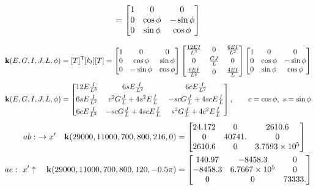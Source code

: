 \begin{enumerate}[leftmargin=*]
    \newpage{}
    \begin{minipage}{0.5\linewidth}
      \begin{equation*}
        [T] = \bmat{1 & 0 & 0\\ 0 & \cos\phi & -\sin\phi\\ 0 & \sin\phi & \cos\phi}
      \end{equation*}
    \end{minipage}\hfill
    \begin{minipage}{0.4\linewidth}\centering
      
    \end{minipage}
    \begin{equation*}
      \mathbf{k}(E,G,I,J,L,\phi) = [T]^{\mathsf{T}}[k_l][T] =
      \begin{bmatrix}1 & 0 & 0\\ 0 & \cos\phi & \sin\phi\\ 0 & -\sin\phi & \cos\phi\end{bmatrix}
      \begin{bmatrix}\frac{12EI}{L^3} & 0 & \frac{6EI}{L^2}\\[3pt] 0 & \frac{GJ}{L} & 0\\[3pt] \frac{6EI}{L^2} & 0 & \frac{4EI}{L}\end{bmatrix}
      \begin{bmatrix}1 & 0 & 0\\ 0 & \cos\phi & -\sin\phi\\ 0 & \sin\phi & \cos\phi\end{bmatrix}
    \end{equation*}
    \begin{equation*}
      \mathbf{k}(E,G,I,J,L,\phi) =
      \begin{bmatrix}
        12E\frac{I}{L^3} & 6sE\frac{I}{L^2} & 6cE\frac{I}{L^2}\\[4pt]
        6sE\frac{I}{L^2} & c^2G\frac JL + 4s^2E\frac IL & -scG\frac JL + 4scE\frac IL\\[4pt]
        6cE\frac{I}{L^2} & -scG\frac JL + 4scE\frac IL & s^2G\frac JL + 4c^2E\frac IL
      \end{bmatrix},\qquad c = \cos\phi,\ s = \sin\phi
    \end{equation*}
    \begin{align*}
      ab:\ \rightarrow x'\quad \kmat(29000, 11000, 700, 800, 216, 0) &= \bmat{24.172 & 0 & 2610.6\\ 0 & 40741. & 0\\ 2610.6 & 0 & 3.7593\times10^5}\\
      ae:\ x'\uparrow\quad \kmat(29000, 11000, 700, 800, 120, -0.5\pi) &= \bmat{140.97 & -8458.3 & 0\\ -8458.3 & 6.7667\times10^5 & 0\\ 0 & 0 & 73333.}\\

\end{align*}
\end{enumerate}
